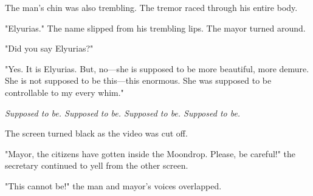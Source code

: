 The man's chin was also trembling. The tremor raced through his entire
body.

"Elyurias." The name slipped from his trembling lips. The mayor turned
around.

"Did you say Elyurias?"

"Yes. It is Elyurias. But, no---she is supposed to be more beautiful, more
demure. She is not supposed to be this---this enormous. She was supposed
to be controllable to my every whim."

\emph{Supposed to be. Supposed to be. Supposed to be. Supposed to be.}

The screen turned black as the video was cut off.

"Mayor, the citizens have gotten inside the Moondrop. Please, be
careful!" the secretary continued to yell from the other screen.

"This cannot be!" the man and mayor's voices overlapped.